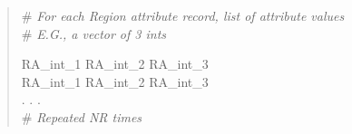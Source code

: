 \documentclass[12pt]{article}
\begin{document}
\begin{verse}
\# \textit{For each Region attribute record, list of attribute values} \\
\# \textit{E.G., a vector of 3 ints}
\vspace{1ex}

RA\_int\_1 \hspace{0.5ex} RA\_int\_2 \hspace{0.5ex} RA\_int\_3 \\
RA\_int\_1 \hspace{0.5ex} RA\_int\_2 \hspace{0.5ex} RA\_int\_3 \\
. . .\\
\# \textit{Repeated NR times}
\vspace{2ex}

\end{verse}
\end{document}
